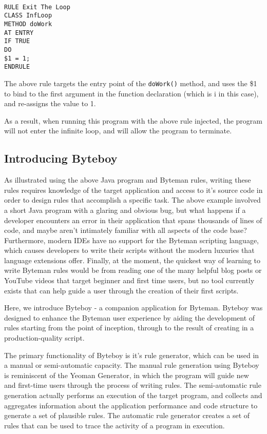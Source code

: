 \documentclass[letterpaper,twocolumn,10pt]{article}
\begin{document}
{\tt \small
\begin{verbatim}
RULE Exit The Loop 
CLASS InfLoop
METHOD doWork
AT ENTRY
IF TRUE
DO
$1 = 1;
ENDRULE
\end{verbatim}
}

The above rule targets the entry point of the {\tt doWork()} method, and uses the \$1 to bind to the first argument in the function declaration (which is i in this case), and re-assigns the value to 1. 

As a result, when running this program with the above rule injected, the program will not enter the infinite loop, and will allow the program to terminate.

\subsection{Introducing Byteboy}

As illustrated using the above Java program and Byteman rules, writing these rules requires knowledge of the target application and access to it's source code in order to design rules that accomplish a specific task. The above example involved a short Java program with a glaring and obvious bug, but what happens if a developer encounters an error in their application that spans thousands of lines of code, and maybe aren't intimately familiar with all aspects of the code base? Furthermore, modern IDEs have no support for the Byteman scripting language, which causes developers to write their scripts without the modern luxuries that language extensions offer. Finally, at the moment, the quickest way of learning to write Byteman rules would be from reading one of the many helpful blog posts\cite{bytemanblog} or YouTube videos\cite{bytemanvideo} that target beginner and first time users, but no tool currently exists that can help guide a user through the creation of their first scripts.

Here, we introduce Byteboy - a companion application for Byteman. Byteboy was designed to enhance the Byteman user experience by aiding the development of rules starting from the point of inception, through to the result of creating in a production-quality script. 

The primary functionality of Byteboy is it's rule generator, which can be used in a manual or semi-automatic capacity. The manual rule generation using Byteboy is reminiscent of the Yeoman Generator\cite{yoman}, in which the program will guide new and first-time users through the process of writing rules. The semi-automatic rule generation actually performs an execution of the target program, and collects and aggregates information about the application performance and code structure to generate a set of plausible rules. The automatic rule generator creates a set of rules that can be used to trace the activity of a program in execution.   
\end{document}
